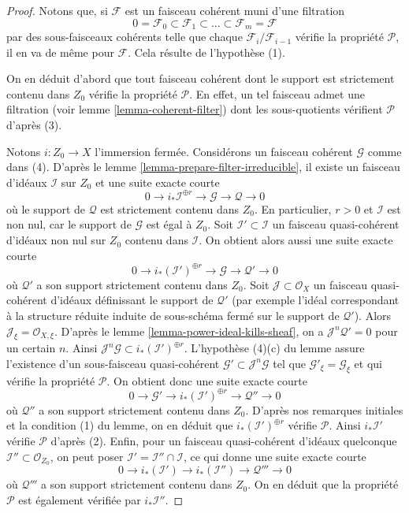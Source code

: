 \begin{proof}
Notons que, si $\mathcal{F}$ est un faisceau cohérent muni d'une filtration
$$
0 = \mathcal{F}_0 \subset \mathcal{F}_1 \subset
\ldots \subset \mathcal{F}_m = \mathcal{F}
$$
par des sous-faisceaux cohérents telle que chaque $\mathcal{F}_i/\mathcal{F}_{i - 1}$
vérifie la propriété $\mathcal{P}$, il en va de même pour $\mathcal{F}$.
Cela résulte de l'hypothèse (1).

\medskip\noindent
On en déduit d'abord que tout faisceau cohérent dont le support
est strictement contenu dans $Z_0$ vérifie la propriété $\mathcal{P}$. En effet, un
tel faisceau admet une filtration (voir lemme \ref{lemma-coherent-filter})
dont les sous-quotients vérifient $\mathcal{P}$ d'après (3).

\medskip\noindent
Notons $i : Z_0 \to X$ l'immersion fermée. Considérons
un faisceau cohérent $\mathcal{G}$ comme dans (4). D'après
le lemme \ref{lemma-prepare-filter-irreducible},
il existe un faisceau d'idéaux $\mathcal{I}$ sur $Z_0$ et
une suite exacte courte
$$
0 \to
i_*\mathcal{I}^{\oplus r} \to
\mathcal{G} \to
\mathcal{Q} \to 0
$$
où le support de $\mathcal{Q}$ est strictement contenu dans $Z_0$.
En particulier, $r > 0$ et $\mathcal{I}$ est non
nul, car le support de $\mathcal{G}$ est égal à $Z_0$.
Soit $\mathcal{I}' \subset \mathcal{I}$ un faisceau quasi-cohérent d'idéaux
non nul sur $Z_0$ contenu dans $\mathcal{I}$.
On obtient alors aussi une suite exacte courte
$$
0 \to
i_*(\mathcal{I}')^{\oplus r} \to
\mathcal{G} \to
\mathcal{Q}' \to 0
$$
où $\mathcal{Q}'$ a son support strictement contenu dans $Z_0$.
Soit $\mathcal{J} \subset \mathcal{O}_X$ un faisceau quasi-cohérent
d'idéaux définissant le support de $\mathcal{Q}'$ (par exemple
l'idéal correspondant à la structure réduite induite de sous-schéma
fermé sur le support de $\mathcal{Q}'$). Alors
$\mathcal{J}_\xi = \mathcal{O}_{X, \xi}$. D'après le
lemme \ref{lemma-power-ideal-kills-sheaf},
on a $\mathcal{J}^n\mathcal{Q}' = 0$ pour un certain $n$.
Ainsi $\mathcal{J}^n\mathcal{G} \subset i_*(\mathcal{I}')^{\oplus r}$.
L'hypothèse (4)(c) du lemme assure l'existence d'un
sous-faisceau quasi-cohérent $\mathcal{G}' \subset \mathcal{J}^n\mathcal{G}$
tel que $\mathcal{G}'_\xi = \mathcal{G}_\xi$
et qui vérifie la propriété $\mathcal{P}$.
On obtient donc une suite exacte courte
$$
0 \to \mathcal{G}' \to
i_*(\mathcal{I}')^{\oplus r} \to
\mathcal{Q}'' \to 0
$$
où $\mathcal{Q}''$ a son support strictement contenu dans $Z_0$.
D'après nos remarques initiales et la condition (1) du lemme, on
en déduit que $i_*(\mathcal{I}')^{\oplus r}$ vérifie
$\mathcal{P}$. Ainsi $i_*\mathcal{I}'$ vérifie
$\mathcal{P}$ d'après (2). Enfin, pour un faisceau
quasi-cohérent d'idéaux quelconque $\mathcal{I}'' \subset \mathcal{O}_{Z_0}$, on peut poser
$\mathcal{I}' = \mathcal{I}'' \cap \mathcal{I}$, ce qui
donne une suite exacte courte
$$
0 \to
i_*(\mathcal{I}') \to
i_*(\mathcal{I}'') \to
\mathcal{Q}''' \to 0
$$
où $\mathcal{Q}'''$ a son support strictement contenu dans $Z_0$.
On en déduit que la propriété $\mathcal{P}$ est également vérifiée par
$i_*\mathcal{I}''$.


\end{proof}
